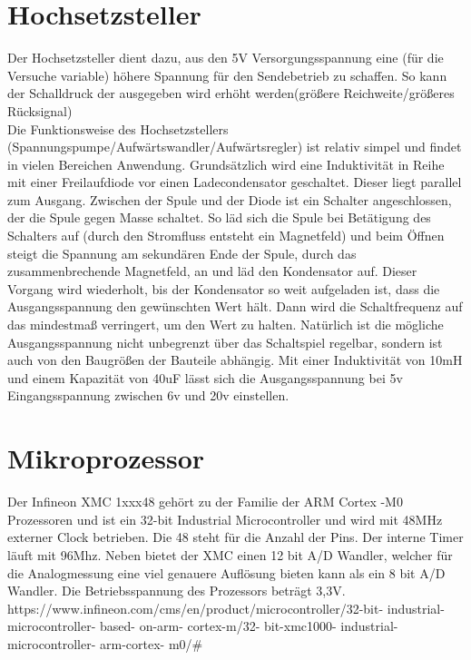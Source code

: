 \section{Hochsetzsteller}
Der Hochsetzsteller dient dazu, aus den 5V Versorgungsspannung eine (für die Versuche variable) höhere Spannung für den Sendebetrieb zu schaffen. So kann der Schalldruck der ausgegeben wird erhöht werden(größere Reichweite/größeres Rücksignal)\\
Die Funktionsweise des Hochsetzstellers (Spannungspumpe/Aufwärtswandler/Aufwärtsregler) ist relativ simpel und findet in vielen Bereichen Anwendung. Grundsätzlich wird eine Induktivität in Reihe mit einer Freilaufdiode vor einen Ladecondensator geschaltet. Dieser liegt parallel zum Ausgang. Zwischen der Spule und der Diode ist ein Schalter angeschlossen, der die Spule gegen Masse schaltet. So läd sich die Spule bei Betätigung des Schalters auf (durch den Stromfluss entsteht ein Magnetfeld) und beim Öffnen steigt die Spannung am sekundären Ende der Spule, durch das zusammenbrechende Magnetfeld, an und läd den Kondensator auf. Dieser Vorgang wird wiederholt, bis der Kondensator so weit aufgeladen ist, dass die Ausgangsspannung den gewünschten Wert hält. Dann wird die Schaltfrequenz auf das mindestmaß verringert, um den Wert zu halten. Natürlich ist die mögliche Ausgangsspannung nicht unbegrenzt über das Schaltspiel regelbar, sondern ist auch von den Baugrößen der Bauteile abhängig. Mit einer Induktivität von 10mH und einem Kapazität von 40uF lässt sich die Ausgangsspannung bei 5v Eingangsspannung zwischen 6v und 20v einstellen.


\section{Mikroprozessor}
Der Infineon XMC 1xxx48 gehört zu der Familie der ARM Cortex -M0 Prozessoren und ist ein 32-bit Industrial Microcontroller und wird mit 48MHz externer Clock betrieben. Die 48 steht für die Anzahl der Pins. Der interne Timer läuft mit 96Mhz. Neben bietet der XMC einen 12 bit A/D Wandler, welcher für die Analogmessung eine viel genauere Auflösung bieten kann als ein 8 bit A/D Wandler. Die Betriebsspannung des Prozessors beträgt 3,3V.\\
https://www.infineon.com/cms/en/product/microcontroller/32-bit- industrial-microcontroller- based-
on-arm- cortex-m/32- bit-xmc1000- industrial-microcontroller- arm-cortex- m0/\#\\
